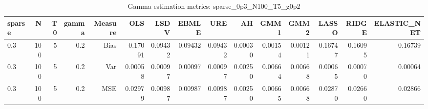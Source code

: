 \begin{table}[!htbp]\centering
\caption{Gamma estimation metrics: sparse_0p3_N100_T5_g0p2}
\label{tab:table1_sparse_0p3_N100_T5_g0p2}
\begin{tabular}{lrrrrrrrrrrrrrr}
\hline
sparse & N & T0 & gamma & Measure & OLS & LSDV & EBMLE & URE & AH & GMM1 & GMM2 & LASSO & RIDGE & ELASTIC_NET \\
\hline
0.3 & 100 & 5 & 0.2 & Bias & -0.17091 & 0.09432 & 0.09432 & 0.09432 & 0.00030 & 0.00154 & 0.00121 & -0.16747 & -0.16095 & -0.16739 \\
0.3 & 100 & 5 & 0.2 & Var & 0.00058 & 0.00097 & 0.00097 & 0.00097 & 0.00250 & 0.00664 & 0.00668 & 0.00065 & 0.00070 & 0.00064 \\
0.3 & 100 & 5 & 0.2 & MSE & 0.02979 & 0.00987 & 0.00987 & 0.00987 & 0.00250 & 0.00665 & 0.00668 & 0.02870 & 0.02660 & 0.02866 \\
\hline
\end{tabular}
\end{table}


